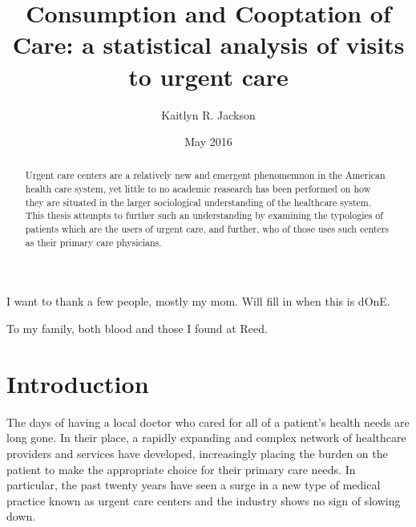 \documentclass[12pt,twoside]{reedthesis}
\title{Consumption and Cooptation of Care: a statistical analysis of visits to
urgent care}
\author{Kaitlyn R. Jackson}
\date{May 2016}
\begin{document}
      \maketitle
  
  \frontmatter %
  \pagestyle{empty} %

      \begin{acknowledgements}
      I want to thank a few people, mostly my mom. Will fill in when this is
      dOnE.
    \end{acknowledgements}
  
  

      \hypersetup{linkcolor=black}
    \setcounter{tocdepth}{1}
    \tableofcontents
  
      \listoftables
  
      \listoffigures
  
      \begin{abstract}
      Urgent care centers are a relatively new and emergent phenomemnon in the
      American health care system, yet little to no academic reasearch has
      been performed on how they are situated in the larger sociological
      understanding of the healthcare system. This thesis attempts to further
      such an understanding by examining the typologies of patients which are
      the users of urgent care, and further, who of those uses such centers as
      their primary care physicians.
    \end{abstract}
  
      \begin{dedication}
      To my family, both blood and those I found at Reed.
    \end{dedication}
  
  \mainmatter %
  \pagestyle{fancyplain} %

  \chapter*{Introduction}\label{introduction}
  
  \setcounter{chapter}{1} \setcounter{section}{0} \doublespacing
  
  The days of having a local doctor who cared for all of a patient's
  health needs are long gone. In their place, a rapidly expanding and
  complex network of healthcare providers and services have developed,
  increasingly placing the burden on the patient to make the appropriate
  choice for their primary care needs. In particular, the past twenty
  years have seen a surge in a new type of medical practice known as
  urgent care centers and the industry shows no sign of slowing down.
  
\end{document}

